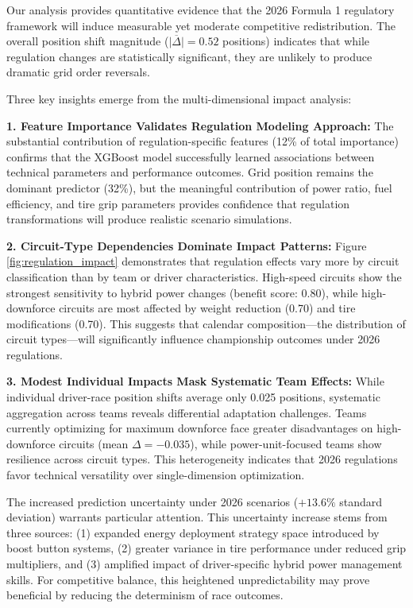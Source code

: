 \documentclass[conference]{IEEEtran}
\begin{document}
Our analysis provides quantitative evidence that the 2026 Formula 1 regulatory framework will induce measurable yet moderate competitive redistribution. The overall position shift magnitude ($\overline{|\Delta|} = 0.52$ positions) indicates that while regulation changes are statistically significant, they are unlikely to produce dramatic grid order reversals.

Three key insights emerge from the multi-dimensional impact analysis:

\textbf{1. Feature Importance Validates Regulation Modeling Approach:} The substantial contribution of regulation-specific features (12\% of total importance) confirms that the XGBoost model successfully learned associations between technical parameters and performance outcomes. Grid position remains the dominant predictor (32\%), but the meaningful contribution of power ratio, fuel efficiency, and tire grip parameters provides confidence that regulation transformations will produce realistic scenario simulations.

\textbf{2. Circuit-Type Dependencies Dominate Impact Patterns:} Figure \ref{fig:regulation_impact} demonstrates that regulation effects vary more by circuit classification than by team or driver characteristics. High-speed circuits show the strongest sensitivity to hybrid power changes (benefit score: 0.80), while high-downforce circuits are most affected by weight reduction (0.70) and tire modifications (0.70). This suggests that calendar composition—the distribution of circuit types—will significantly influence championship outcomes under 2026 regulations.

\textbf{3. Modest Individual Impacts Mask Systematic Team Effects:} While individual driver-race position shifts average only 0.025 positions, systematic aggregation across teams reveals differential adaptation challenges. Teams currently optimizing for maximum downforce face greater disadvantages on high-downforce circuits (mean $\Delta = -0.035$), while power-unit-focused teams show resilience across circuit types. This heterogeneity indicates that 2026 regulations favor technical versatility over single-dimension optimization.

The increased prediction uncertainty under 2026 scenarios ($+13.6\%$ standard deviation) warrants particular attention. This uncertainty increase stems from three sources: (1) expanded energy deployment strategy space introduced by boost button systems, (2) greater variance in tire performance under reduced grip multipliers, and (3) amplified impact of driver-specific hybrid power management skills. For competitive balance, this heightened unpredictability may prove beneficial by reducing the determinism of race outcomes.
\end{document}
